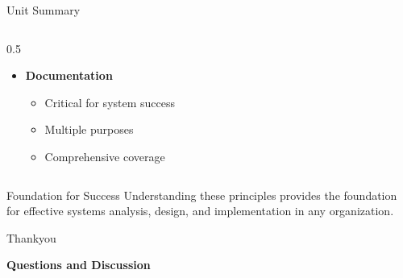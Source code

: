 \documentclass[aspectratio=169]{beamer}
\begin{document}
\begin{frame}{Unit Summary}
\begin{columns}
\begin{column}{0.5\textwidth}
\begin{itemize}
                \item[\faCheckCircle] \textbf{Documentation}
                \begin{itemize}
                    \item Critical for system success
                    \item Multiple purposes
                    \item Comprehensive coverage
                \end{itemize}
            \end{itemize}
        \end{column}
    \end{columns}
    
    \begin{block}{Foundation for Success}
        Understanding these principles provides the foundation for effective systems analysis, design, and implementation in any organization.
    \end{block}
\end{frame}

    
    
    
    



\begin{frame}{Thankyou}
 
    \vspace{0.5cm}
    \begin{center}
        \Large{\textbf{Questions and Discussion}}
    \end{center}
\end{frame}
\end{document}
